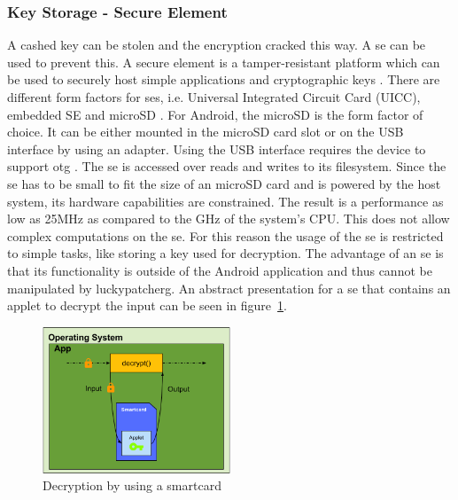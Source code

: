 \subsubsection{Key Storage - Secure Element} \label{section:counter-replace-encryption-key-local}
A cashed key can be stolen \cite{memoryDump} and the encryption cracked this way.
A \gls{se} can be used to prevent this.
\newline
A secure element is a tamper-resistant platform which can be used to securely host simple applications and cryptographic keys \cite{seDefinition}.
There are different form factors for \gls{se}s, i.e. Universal Integrated Circuit Card (UICC), embedded SE and microSD \cite{seDefinition}.
For Android, the microSD is the form factor of choice.
It can be either mounted in the microSD card slot or on the USB interface by using an adapter.
Using the USB interface requires the device to support \gls{otg} \cite{usbOtg}.
The \gls{se} is accessed over reads and writes to its filesystem.
Since the \gls{se} has to be small to fit the size of an microSD card and is powered by the host system, its hardware capabilities are constrained.
The result is a performance as low as 25MHz as compared to the GHz of the system's CPU.
This does not allow complex computations on the \gls{se}. \cite{stSe}
For this reason the usage of the \gls{se} is restricted to simple tasks, like storing a key used for decryption.
The advantage of an \gls{se} is that its functionality is outside of the Android application and thus cannot be manipulated by \gls{luckypatcherg}.
\newline
An abstract presentation for a \gls{se} that contains an applet to decrypt the input can be seen in figure~\ref{fig:encryptionKeySmart}.
\newline
\begin{figure}[h]
    \centering
    \includegraphics[width=0.5\textwidth]{data/encryptionKeySmart.png}
    \caption{Decryption by using a smartcard}
    \label{fig:encryptionKeySmart}
\end{figure}
